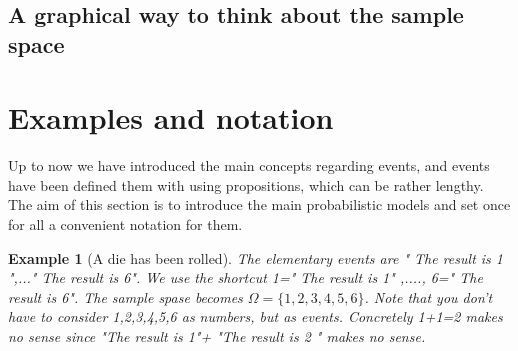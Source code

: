 \documentclass[reqno]{amsart}
\newtheorem{example}[theorem]{Example}
\newcommand{\<}{{\langle \!\! \langle}}
\renewcommand{\>}{{\rangle \!\! \rangle}}
\newcommand{\commento}[1]{
	\par\noindent
	\colorbox{light}{\begin{minipage}{120 mm}#1\end{minipage}}
	\par\noindent
}
\begin{document}
\subsection{ A graphical way to think about the sample space}
%
%
%
%
%
%
%
%

\section{Examples and notation}
Up to now we have introduced the main concepts regarding events, and events have been defined them with using propositions, which can be rather lengthy. The aim of this section is to introduce the main probabilistic models and set once for all a convenient notation for them.

\begin{example}[A die has been rolled]
The elementary events are " The result is 1 ",..." The result is 6". We use the shortcut 1=" The result is 1" ,...., 6=" The result is 6". The sample spase becomes $\Omega=\{1,2,3,4,5,6\}$. Note that you don't have to consider  1,2,3,4,5,6 as numbers, but as events. Concretely 1+1=2 makes no sense since "The result is 1"+ "The result is 2 " makes no sense.
\end{example}
\end{document}
